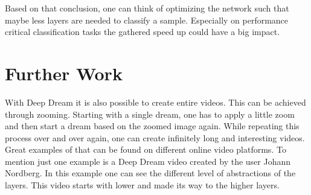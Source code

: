 Based on that conclusion, one can think of optimizing the network such that maybe less layers are needed to classify a sample.
Especially on performance critical classification tasks the gathered speed up could have a big impact.


\section{Further Work}
With Deep Dream it is also possible to create entire videos.
This can be achieved through zooming.
Starting with a single dream, one has to apply a little zoom and then start a dream based on the zoomed image again.
While repeating this process over and over again, one can create infinitely long and interesting videos.
Great examples of that can be found on different online video platforms.
To mention just one example is a Deep Dream video created by the user Johann Nordberg\cite{https://vimeo.com/132700334}.
In this example one can see the different level of abstractions of the layers.
This video starts with lower and made its way to the higher layers.

